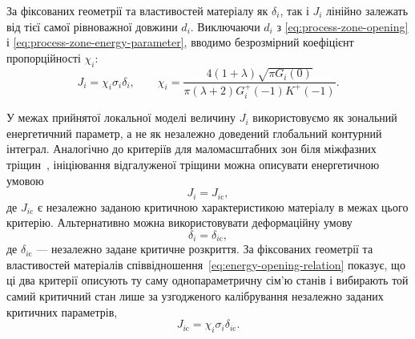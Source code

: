 За фіксованих геометрії та властивостей матеріалу як $\delta_i$, так і
$J_i$ лінійно залежать від тієї самої рівноважної довжини $d_i$.
Виключаючи $d_i$ з
\eqref{eq:process-zone-opening} і
\eqref{eq:process-zone-energy-parameter}, вводимо безрозмірний
коефіцієнт пропорційності $\chi_i$:
\begin{equation}
\label{eq:energy-opening-relation}
  J_i=\chi_i\sigma_i\delta_i,
  \qquad
  \chi_i=
  \frac{4(1+\lambda)\sqrt{\pi G_i(0)}}
  {\pi(\lambda+2)G_i^+(-1)K^+(-1)}.
\end{equation}

У межах прийнятої локальної моделі величину $J_i$ використовуємо як
зональний енергетичний параметр, а не як незалежно доведений глобальний
контурний інтеграл. Аналогічно до критеріїв для маломасштабних зон біля
міжфазних тріщин~\cite{KaminskyEtAl2023}, ініціювання відгалуженої
тріщини можна описувати енергетичною умовою
\begin{equation*}
  J_i=J_{i\mathrm{c}},
\end{equation*}
де $J_{i\mathrm{c}}$ є незалежно заданою критичною характеристикою
матеріалу в межах цього критерію. Альтернативно можна використовувати
деформаційну умову
\begin{equation*}
  \delta_i=\delta_{i\mathrm{c}},
\end{equation*}
де $\delta_{i\mathrm{c}}$ --- незалежно задане критичне розкриття.
За фіксованих геометрії та властивостей матеріалів
співвідношення~\eqref{eq:energy-opening-relation} показує, що ці два
критерії описують ту саму однопараметричну сім'ю станів і вибирають той
самий критичний стан лише за узгодженого калібрування незалежно заданих
критичних параметрів,
\begin{equation*}
  J_{i\mathrm{c}}=\chi_i\sigma_i\delta_{i\mathrm{c}}.
\end{equation*}
